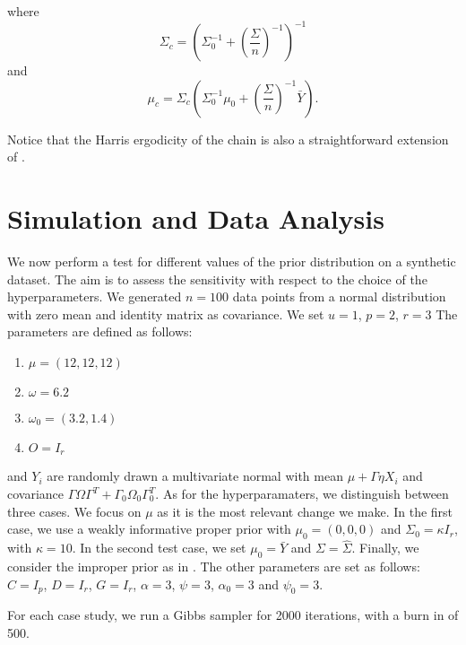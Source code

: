 \documentclass[graybox]{svmult}
\begin{document}
where $$\Sigma_{c} = \left( \Sigma^{-1}_0 + \left(\frac{\Sigma}{n} \right)^{-1}\right)^{-1}$$ and $$\mu_{c} = \Sigma_{c} \left( \Sigma_0^{-1} \mu_0 + \left(\frac{\Sigma}{n} \right)^{-1} \bar{Y} \right).$$

Notice that the Harris ergodicity of the chain is also a
straightforward extension of \cite{khareBayesianApproachEnvelope2017}.

\section{Simulation and Data Analysis}
We now perform a test for different values of the prior distribution
on a synthetic dataset. The aim is to assess the sensitivity with
respect to the choice of the hyperparameters. We generated $n = 100$
data points from a normal distribution with zero mean and identity
matrix as covariance. We set $u = 1$, $p = 2$, $r = 3$ The parameters
are defined as follows:

\begin{enumerate}
\item $\mu = \left( 12, 12, 12 \right)$
\item $\omega = 6.2$
\item $\omega_0 = \left( 3.2, 1.4 \right)$
\item $O = I_r$
\end{enumerate}

and $Y_i$ are randomly drawn a multivariate normal with mean
$\mu + \Gamma \eta X_i$ and covariance
$\Gamma \Omega \Gamma^T + \Gamma_0 \Omega_0 \Gamma_{0}^T$.  As for the
hyperparamaters, we distinguish between three cases. We focus on $\mu$
as it is the most relevant change we make. In the first case, we use a
weakly informative proper prior with $\mu_0 = \left( 0, 0, 0 \right)$
and $\Sigma_0 = \kappa I_r$, with $\kappa = 10$. In the second test
case, we set $\mu_0 = \bar{Y}$ and $\Sigma = \hat{\Sigma}$. Finally,
we consider the improper prior as in
\cite{khareBayesianApproachEnvelope2017}. The other parameters are set
as follows: $C = I_p$, $D = I_r$, $G = I_r$, $\alpha = 3$, $\psi = 3$, $\alpha_0 = 3$ and $\psi_0 = 3$.

For each case study, we run
a Gibbs sampler for 2000 iterations, with a burn in of 500.


\end{document}
